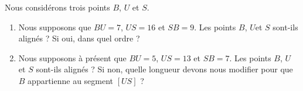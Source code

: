 
\begin{exercice}\label{exosmath-0773}

Nous considérons trois points $B$, $U$ et $S$.
\begin{enumerate}
    \item
        
 Nous supposons que $BU = 7$, $US = 16$ et $SB = 9$. Les points $B$, $U $et $S$ sont-ils alignés ?  Si oui, dans quel ordre ?

\item
Nous supposons à présent que $BU = 5$, $US = 13$ et $SB = 7$. Les points $B$, $U$ et $S$ sont-ils alignés ?  Si non, quelle longueur devons nous modifier pour que $B$ appartienne au segment $[US]$ ?
\end{enumerate}


\end{exercice}
